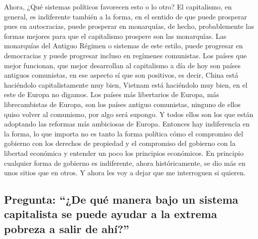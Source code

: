 Ahora, ¿Qué sistemas políticos favorecen esto o lo otro? El capitalismo, en general, es indiferente también a la forma, en el sentido de que puede prosperar pues en autocracias, puede prosperar en monarquías, de hecho, probablemente las formas mejores para que el capitalismo prospere son las monarquías. Las monarquías del Antiguo Régimen o sistemas de este estilo, puede progresar en democracias y puede progresar incluso en regímenes comunistas. Los países que mejor funcionan, que mejor desarrollan al capitalismo a día de hoy son países antiguos comunistas, en ese aspecto sí que son positivos, es decir, China está haciéndolo capitalistamente muy bien, Vietnam está haciéndolo muy bien,
en el este de Europa no digamos. Los países más libertarios de Europa, más librecambistas de Europa, son los países antiguo comunistas, ninguno de ellos quiso volver al comunismo, por algo será supongo. Y todos ellos son los que están adoptando las reformas más ambiciosas de Europa. Entonces hay indiferencia en la forma, lo que importa no es tanto la forma política cómo el compromiso del gobierno con los derechos de propiedad y el compromiso del gobierno con la libertad económica y entender un poco los principios económicos. En principio cualquier forma de gobierno es indiferente, ahora históricamente, se dio más en unos sitios que en otros. Y ahora les voy a dejar que me interroguen si quieren.

\subsection{Pregunta: \enquote{¿De qué manera bajo un sistema capitalista se puede ayudar a la extrema pobreza a salir de ahí?}}

